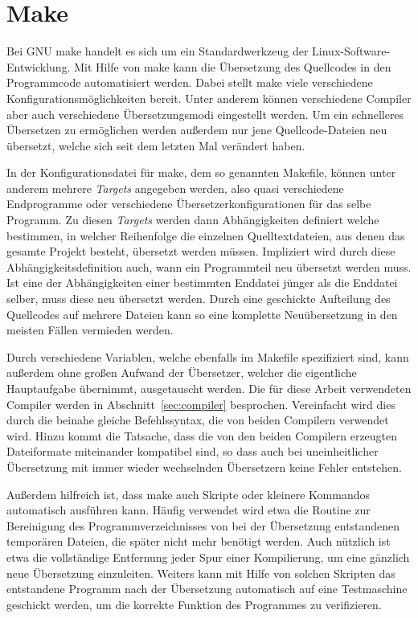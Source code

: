 \section{Make}
\label{sec:make}
Bei GNU make handelt es sich um ein Standardwerkzeug der Linux-Software-Entwicklung. Mit Hilfe von make kann die Übersetzung des Quellcodes in den Programmcode automatisiert werden. 
Dabei stellt make viele verschiedene Konfigurationsmöglichkeiten bereit. Unter anderem können verschiedene Compiler aber auch verschiedene Übersetzungsmodi eingestellt werden.
Um ein schnelleres Übersetzen zu ermöglichen werden außerdem nur jene Quellcode-Dateien neu übersetzt, welche sich seit dem letzten Mal verändert haben. 

In der Konfigurationsdatei für make, dem so genannten Makefile, können unter anderem mehrere \textit{Targets} angegeben werden, also quasi verschiedene Endprogramme oder verschiedene
Übersetzerkonfigurationen für das selbe Programm. Zu diesen \textit{Targets} werden dann Ab\-hängig\-keiten definiert welche bestimmen, in welcher Reihenfolge die einzelnen Quelltextdateien, aus denen das gesamte Projekt besteht, übersetzt werden 
müssen. Impliziert wird durch diese Abhängigkeitsdefinition auch, wann ein Programmteil neu übersetzt werden muss. Ist eine der Abhängigkeiten einer bestimmten Enddatei jünger als die 
Enddatei selber, muss diese neu übersetzt werden. Durch eine geschickte Aufteilung des Quellcodes auf mehrere Dateien kann so eine komplette Neuübersetzung in den meisten Fällen vermieden werden. 

Durch verschiedene Variablen, welche ebenfalls im Makefile spezifiziert sind, kann außerdem ohne großen Aufwand der Übersetzer, welcher die eigentliche Hauptaufgabe übernimmt, ausgetauscht werden.
Die für diese Arbeit verwendeten Compiler werden in Abschnitt~\ref{sec:compiler} besprochen. Vereinfacht wird dies durch die beinahe gleiche Befehlssyntax, die von beiden Compilern verwendet wird.
Hinzu kommt die Tatsache, dass die von den beiden Compilern erzeugten Dateiformate miteinander kompatibel sind, so dass auch bei uneinheitlicher Übersetzung mit immer wieder wechselnden Übersetzern
keine Fehler entstehen.

Außerdem hilfreich ist, dass make auch Skripte oder kleinere Kommandos automatisch aus\-füh\-ren kann. Häufig verwendet wird etwa die Routine zur Bereinigung des Programmverzeichnisses von bei der
Übersetzung entstandenen temporären Dateien, die später nicht mehr benötigt werden. Auch nützlich ist etwa die vollständige Entfernung jeder Spur einer Kompilierung, um eine gänzlich neue
Übersetzung einzuleiten. Weiters kann mit Hilfe von solchen Skripten das entstandene Programm nach der Übersetzung automatisch auf eine Testmaschine geschickt werden, um die korrekte Funktion
des Programmes zu verifizieren.

